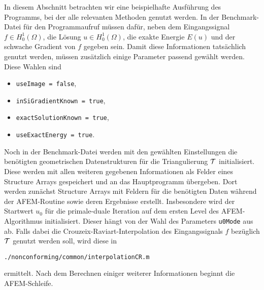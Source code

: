 In diesem Abschnitt betrachten wir eine beispielhafte Ausführung des Programms,
bei der alle relevanten Methoden genutzt werden.
In der Benchmark-Datei für den Programmaufruf müssen dafür, neben dem
Eingangssignal $f\in H^1_0(\Omega)$, die Lösung $u\in H^1_0(\Omega)$, die
exakte Energie $E(u)$ und der schwache Gradient von $f$ gegeben sein. 
Damit diese Informationen tatsächlich genutzt werden, müssen zusätzlich einige
Parameter passend gewählt werden. 
Diese Wahlen sind
\begin{itemize}
  \item \texttt{useImage = false},
  \item \texttt{inSiGradientKnown = true},
  \item \texttt{exactSolutionKnown = true},
  \item \texttt{useExactEnergy = true}.
\end{itemize}
Noch in der Benchmark-Datei werden mit den gewählten Einstellungen die
benötigten geometrischen Datenstrukturen für die Triangulierung $\mathcal{T}$
initialisiert. 
Diese werden mit allen weiteren gegebenen Informationen als Felder eines
Structure Arrays gespeichert und an das Hauptprogramm übergeben. 
Dort werden zunächst Structure Arrays mit Feldern für die benötigten Daten
während der AFEM-Routine sowie deren Ergebnisse erstellt. 
Insbesondere wird der Startwert $u_0$ für die primale-duale Iteration
auf dem ersten Level des AFEM-Algorithmus initialisiert. 
Dieser hängt von der Wahl des Parameters \texttt{u0Mode} aus
 ab.
Falls dabei die Crouzeix-Raviart-Interpolation des Eingangssignals $f$ 
bezüglich $\mathcal{T}$ genutzt werden soll, wird diese in
\begin{center}
  \texttt{./nonconforming/common/interpolationCR.m}
\end{center}
ermittelt.
Nach dem Berechnen einiger weiterer Informationen beginnt die AFEM-Schleife.

